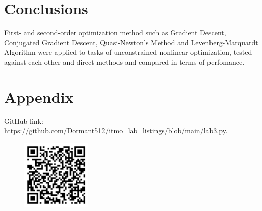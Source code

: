 \documentclass[12pt, a4paper]{article}
\begin{document}
\section*{Conclusions}

First- and second-order optimization method such as Gradient Descent, Conjugated Gradient Descent, Quasi-Newton's Method and Levenberg-Marquardt Algorithm were applied to tasks of unconstrained nonlinear optimization, tested against each other and direct methods and compared in terms of perfomance.

\newpage

\section*{Appendix}

GitHub link: \url{https://github.com/Dormant512/itmo_lab_listings/blob/main/lab3.py}.

\begin{figure}[!h]
\centering
\includegraphics[width=0.3\textwidth]{lab3.png}
\end{figure}
\end{document}
